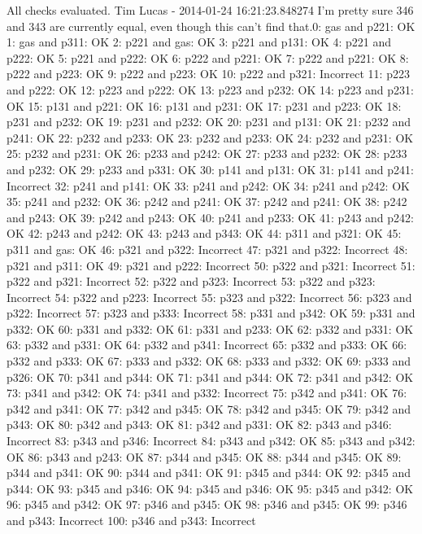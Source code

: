 All checks evaluated.
Tim Lucas - 2014-01-24 16:21:23.848274
I'm pretty sure 346 and 343 are currently equal, even though this can't find that.0: gas and p221: OK
1: gas and p311: OK
2: p221 and gas: OK
3: p221 and p131: OK
4: p221 and p222: OK
5: p221 and p222: OK
6: p222 and p221: OK
7: p222 and p221: OK
8: p222 and p223: OK
9: p222 and p223: OK
10: p222 and p321: Incorrect
11: p223 and p222: OK
12: p223 and p222: OK
13: p223 and p232: OK
14: p223 and p231: OK
15: p131 and p221: OK
16: p131 and p231: OK
17: p231 and p223: OK
18: p231 and p232: OK
19: p231 and p232: OK
20: p231 and p131: OK
21: p232 and p241: OK
22: p232 and p233: OK
23: p232 and p233: OK
24: p232 and p231: OK
25: p232 and p231: OK
26: p233 and p242: OK
27: p233 and p232: OK
28: p233 and p232: OK
29: p233 and p331: OK
30: p141 and p131: OK
31: p141 and p241: Incorrect
32: p241 and p141: OK
33: p241 and p242: OK
34: p241 and p242: OK
35: p241 and p232: OK
36: p242 and p241: OK
37: p242 and p241: OK
38: p242 and p243: OK
39: p242 and p243: OK
40: p241 and p233: OK
41: p243 and p242: OK
42: p243 and p242: OK
43: p243 and p343: OK
44: p311 and p321: OK
45: p311 and gas: OK
46: p321 and p322: Incorrect
47: p321 and p322: Incorrect
48: p321 and p311: OK
49: p321 and p222: Incorrect
50: p322 and p321: Incorrect
51: p322 and p321: Incorrect
52: p322 and p323: Incorrect
53: p322 and p323: Incorrect
54: p322 and p223: Incorrect
55: p323 and p322: Incorrect
56: p323 and p322: Incorrect
57: p323 and p333: Incorrect
58: p331 and p342: OK
59: p331 and p332: OK
60: p331 and p332: OK
61: p331 and p233: OK
62: p332 and p331: OK
63: p332 and p331: OK
64: p332 and p341: Incorrect
65: p332 and p333: OK
66: p332 and p333: OK
67: p333 and p332: OK
68: p333 and p332: OK
69: p333 and p326: OK
70: p341 and p344: OK
71: p341 and p344: OK
72: p341 and p342: OK
73: p341 and p342: OK
74: p341 and p332: Incorrect
75: p342 and p341: OK
76: p342 and p341: OK
77: p342 and p345: OK
78: p342 and p345: OK
79: p342 and p343: OK
80: p342 and p343: OK
81: p342 and p331: OK
82: p343 and p346: Incorrect
83: p343 and p346: Incorrect
84: p343 and p342: OK
85: p343 and p342: OK
86: p343 and p243: OK
87: p344 and p345: OK
88: p344 and p345: OK
89: p344 and p341: OK
90: p344 and p341: OK
91: p345 and p344: OK
92: p345 and p344: OK
93: p345 and p346: OK
94: p345 and p346: OK
95: p345 and p342: OK
96: p345 and p342: OK
97: p346 and p345: OK
98: p346 and p345: OK
99: p346 and p343: Incorrect
100: p346 and p343: Incorrect
